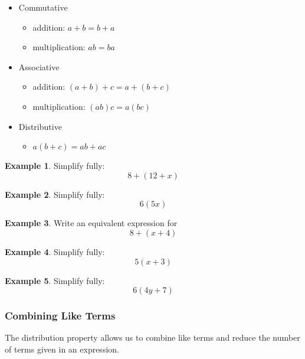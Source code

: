 \documentclass[addpoints,12pt]{exam}
\theoremstyle{definition}
\newtheorem{example}{Example}[subsection]
\begin{document}
\begin{itemize}
\item Commutative
\begin{itemize}
\item addition: $a + b = b + a$
\item multiplication: $ab = ba$
\end{itemize}
\item Associative
\begin{itemize}
\item addition: $(a + b) + c = a + (b + c)$
\item multiplication: $(ab)c = a(bc)$
\end{itemize}
\item Distributive
\begin{itemize}
\item $a(b+c) = ab + ac$
\end{itemize}
\end{itemize}

\begin{example}
Simplify fully: \[8 + (12 + x)\]
\vspace{.75in}
\end{example}

\begin{example}
Simplify fully: \[ 6(5x)\]
\vspace{.75in}
\end{example}

\begin{example}
Write an equivalent expression for \[8 + (x + 4)\]
\vspace{.75in}
\end{example}

\newpage

\begin{example}
Simplify fully: \[5(x+3)\]
\vspace{.75in}
\end{example}

\begin{example}
Simplify fully: \[6(4y+7)\]
\vspace{.75in}
\end{example}

\subsubsection*{Combining Like Terms}
\noindent The distribution property allows us to combine like terms and reduce the number of terms given in an expression.
\end{document}
